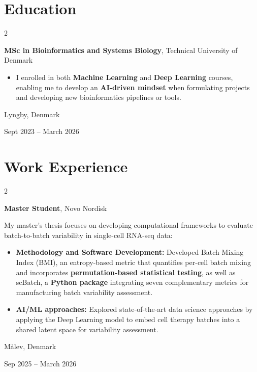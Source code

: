 \documentclass[10pt, letterpaper]{article}
\newenvironment{highlights}{
    \begin{itemize}[
        topsep=0.10 cm,
        parsep=0.10 cm,
        partopsep=0pt,
        itemsep=0pt,
        leftmargin=0.4 cm + 10pt
    ]
}{
    \end{itemize}
}
\newenvironment{twocolentry}[2][]{
    \onecolentry
    \def\secondColumn{#2}
    \setcolumnwidth{\fill, 4.5 cm}
    \begin{paracol}{2}
}{
    \switchcolumn \raggedleft \secondColumn
    \end{paracol}
    \endonecolentry
}
\begin{document}
    \section{Education}

        \begin{twocolentry}{
    Lyngby, Denmark

    Sept 2023 -- March 2026
}
    \textbf{MSc in Bioinformatics and Systems Biology}, Technical University of Denmark
    \begin{highlights}
        \item I enrolled in both \textbf{Machine Learning} and \textbf{Deep Learning} courses, enabling me to develop an \textbf{AI-driven mindset} when formulating projects and developing new bioinformatics pipelines or tools.
    \end{highlights}
\end{twocolentry}


    \section{Work Experience}

        \begin{twocolentry}{
    Målev, Denmark

    Sep 2025 -- March 2026
}
    \textbf{Master Student}, Novo Nordisk

    \vspace{0.1cm}

    My master's thesis focuses on developing computational frameworks to evaluate batch-to-batch variability in single-cell RNA-seq data:

    \begin{highlights}

        \item \textbf{Methodology and Software Development:} Developed Batch Mixing Index (BMI), an entropy-based metric that quantifies per-cell batch mixing and incorporates \textbf{permutation-based statistical testing}, as well as scBatch, a \textbf{Python package} integrating seven complementary metrics for manufacturing batch variability assessment.

        \vspace{0.1cm}

        \item \textbf{AI/ML approaches:} Explored state-of-the-art data science approaches by applying the Deep Learning model to embed cell therapy batches into a shared latent space for variability assessment.

    \end{highlights}
\end{twocolentry}
\end{document}
